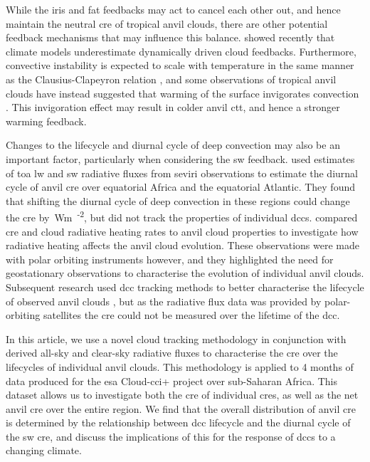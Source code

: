 \documentclass[acp, manuscript]{copernicus}
\begin{document}
While the iris and \acrshort{fat} feedbacks may act to cancel each other out, and hence maintain the neutral \acrshort{cre} of tropical anvil clouds, there are other potential feedback mechanisms that may influence this balance.
\citet{hill_climate_2023} showed recently that climate models underestimate dynamically driven cloud feedbacks.
Furthermore, convective instability is expected to scale with temperature in the same manner as the Clausius-Clapeyron relation \citep{seeley_why_2015, agard_clausius_2017}, and some observations of tropical anvil clouds have instead suggested that warming of the surface invigorates convection \citep{igel_cloudsat_2014}.
This invigoration effect may result in colder anvil \acrshort{ctt}, and hence a stronger warming feedback.

Changes to the lifecycle and diurnal cycle of deep convection may also be an important factor, particularly when considering the \acrshort{sw} feedback. 
\citet{nowicki_observations_2004} used estimates of \acrfull{toa} \acrshort{lw} and \acrshort{sw} radiative fluxes from \acrfull{seviri} observations to estimate the diurnal cycle of anvil \acrshort{cre} over equatorial Africa and the equatorial Atlantic. 
They found that shifting the diurnal cycle of deep convection in these regions could change the \acrshort{cre} by \,\unit{Wm\textsuperscript{-2}}, but did not track the properties of individual \acrshort{dcc}s.
\citet{bouniol_macrophysical_2016} compared \acrshort{cre} and cloud radiative heating rates to anvil cloud properties to investigate how radiative heating affects the anvil cloud evolution.
These observations were made with polar orbiting instruments however, and they highlighted the need for geostationary observations to characterise the evolution of individual anvil clouds.
Subsequent research used \acrshort{dcc} tracking methods to better characterise the lifecycle of observed anvil clouds \citep{bouniol_life_2021}, but as the radiative flux data was provided by polar-orbiting satellites the \acrshort{cre} could not be measured over the lifetime of the \acrshort{dcc}.

In this article, we use a novel cloud tracking methodology in conjunction with derived all-sky and clear-sky radiative fluxes to characterise the \acrshort{cre} over the lifecycles of individual anvil clouds. 
This methodology is applied to 4 months of data produced for the \acrshort{esa} Cloud-\acrshort{cci}+ project over sub-Saharan Africa. 
This dataset allows us to investigate both the \acrshort{cre} of individual \acrshort{cre}s, as well as the net anvil \acrshort{cre} over the entire region. 
We find that the overall distribution of anvil \acrshort{cre} is determined by the relationship between \acrshort{dcc} lifecycle and the diurnal cycle of the \acrshort{sw} \acrshort{cre}, and discuss the implications of this for the response of \acrshort{dcc}s to a changing climate.
\end{document}
